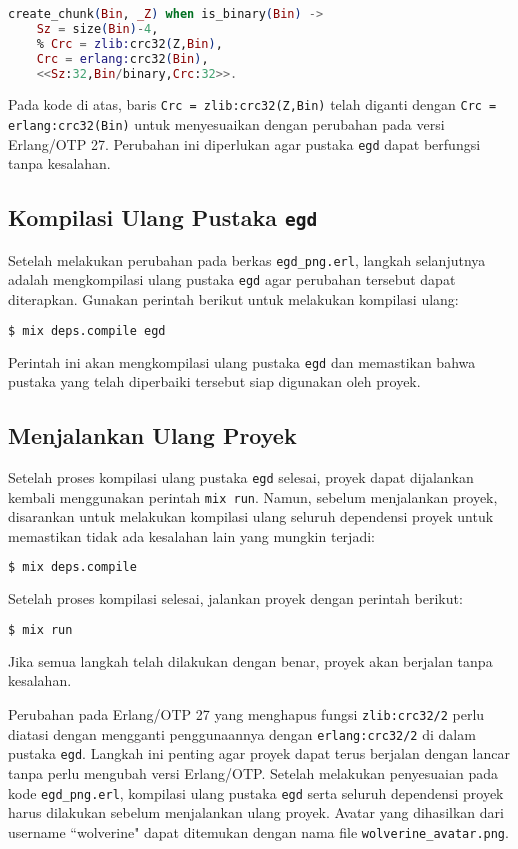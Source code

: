\begin{lstlisting}[language=Elixir]
	create_chunk(Bin, _Z) when is_binary(Bin) ->
	Sz = size(Bin)-4,
	% Crc = zlib:crc32(Z,Bin),
	Crc = erlang:crc32(Bin),
	<<Sz:32,Bin/binary,Crc:32>>.
\end{lstlisting}

Pada kode di atas, baris \texttt{Crc = zlib:crc32(Z,Bin)} telah diganti dengan \texttt{Crc = erlang:crc32(Bin)} untuk menyesuaikan dengan perubahan pada versi Erlang/OTP 27. Perubahan ini diperlukan agar pustaka \texttt{egd} dapat berfungsi tanpa kesalahan.

\subsection{Kompilasi Ulang Pustaka \texttt{egd}}

Setelah melakukan perubahan pada berkas \texttt{egd\_png.erl}, langkah selanjutnya adalah mengkompilasi ulang pustaka \texttt{egd} agar perubahan tersebut dapat diterapkan. Gunakan perintah berikut untuk melakukan kompilasi ulang:

\begin{lstlisting}[language=bash]
	$ mix deps.compile egd
\end{lstlisting}

Perintah ini akan mengkompilasi ulang pustaka \texttt{egd} dan memastikan bahwa pustaka yang telah diperbaiki tersebut siap digunakan oleh proyek. 

\subsection{Menjalankan Ulang Proyek}

Setelah proses kompilasi ulang pustaka \texttt{egd} selesai, proyek dapat dijalankan kembali menggunakan perintah \texttt{mix run}. Namun, sebelum menjalankan proyek, disarankan untuk melakukan kompilasi ulang seluruh dependensi proyek untuk memastikan tidak ada kesalahan lain yang mungkin terjadi:

\begin{lstlisting}[language=bash]
	$ mix deps.compile
\end{lstlisting}

Setelah proses kompilasi selesai, jalankan proyek dengan perintah berikut:

\begin{lstlisting}[language=bash]
	$ mix run
\end{lstlisting}

Jika semua langkah telah dilakukan dengan benar, proyek akan berjalan tanpa kesalahan.


Perubahan pada Erlang/OTP 27 yang menghapus fungsi \texttt{zlib:crc32/2} perlu diatasi dengan mengganti penggunaannya dengan \texttt{erlang:crc32/2} di dalam pustaka \texttt{egd}. Langkah ini penting agar proyek dapat terus berjalan dengan lancar tanpa perlu mengubah versi Erlang/OTP. Setelah melakukan penyesuaian pada kode \texttt{egd\_png.erl}, kompilasi ulang pustaka \texttt{egd} serta seluruh dependensi proyek harus dilakukan sebelum menjalankan ulang proyek. Avatar yang dihasilkan dari username ``wolverine" dapat ditemukan dengan nama file \texttt{wolverine\_avatar.png}.

